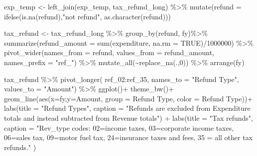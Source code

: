 \documentclass[
  letterpaper,
  DIV=11,
  numbers=noendperiod]{scrreport}
\newenvironment{Shaded}{\begin{snugshade}}{\end{snugshade}}
\newcommand{\AttributeTok}[1]{\textcolor[rgb]{0.40,0.45,0.13}{#1}}
\newcommand{\ConstantTok}[1]{\textcolor[rgb]{0.56,0.35,0.01}{#1}}
\newcommand{\DecValTok}[1]{\textcolor[rgb]{0.68,0.00,0.00}{#1}}
\newcommand{\FunctionTok}[1]{\textcolor[rgb]{0.28,0.35,0.67}{#1}}
\newcommand{\NormalTok}[1]{\textcolor[rgb]{0.00,0.23,0.31}{#1}}
\newcommand{\OtherTok}[1]{\textcolor[rgb]{0.00,0.23,0.31}{#1}}
\newcommand{\SpecialCharTok}[1]{\textcolor[rgb]{0.37,0.37,0.37}{#1}}
\newcommand{\StringTok}[1]{\textcolor[rgb]{0.13,0.47,0.30}{#1}}
\begin{document}
\begin{Shaded}
\begin{Highlighting}[]
    
\NormalTok{exp\_temp }\OtherTok{\textless{}{-}} \FunctionTok{left\_join}\NormalTok{(exp\_temp, tax\_refund\_long) }\SpecialCharTok{\%\textgreater{}\%}
  \FunctionTok{mutate}\NormalTok{(}\AttributeTok{refund =} \FunctionTok{ifelse}\NormalTok{(}\FunctionTok{is.na}\NormalTok{(refund),}\StringTok{"not refund"}\NormalTok{, }\FunctionTok{as.character}\NormalTok{(refund)))}

\NormalTok{tax\_refund }\OtherTok{\textless{}{-}}\NormalTok{ tax\_refund\_long }\SpecialCharTok{\%\textgreater{}\%} 
  \FunctionTok{group\_by}\NormalTok{(refund, fy)}\SpecialCharTok{\%\textgreater{}\%}
  \FunctionTok{summarize}\NormalTok{(}\AttributeTok{refund\_amount =} \FunctionTok{sum}\NormalTok{(expenditure, }\AttributeTok{na.rm =} \ConstantTok{TRUE}\NormalTok{)}\SpecialCharTok{/}\DecValTok{1000000}\NormalTok{) }\SpecialCharTok{\%\textgreater{}\%}
  \FunctionTok{pivot\_wider}\NormalTok{(}\AttributeTok{names\_from =}\NormalTok{ refund, }\AttributeTok{values\_from =}\NormalTok{ refund\_amount, }\AttributeTok{names\_prefix =} \StringTok{"ref\_"}\NormalTok{) }\SpecialCharTok{\%\textgreater{}\%}
  \FunctionTok{mutate\_all}\NormalTok{(}\SpecialCharTok{\textasciitilde{}}\FunctionTok{replace\_na}\NormalTok{(.,}\DecValTok{0}\NormalTok{)) }\SpecialCharTok{\%\textgreater{}\%}
  \FunctionTok{arrange}\NormalTok{(fy)}

\NormalTok{tax\_refund }\SpecialCharTok{\%\textgreater{}\%} 
  \FunctionTok{pivot\_longer}\NormalTok{( ref\_02}\SpecialCharTok{:}\NormalTok{ref\_35, }\AttributeTok{names\_to =} \StringTok{"Refund Type"}\NormalTok{, }\AttributeTok{values\_to =} \StringTok{"Amount"}\NormalTok{) }\SpecialCharTok{\%\textgreater{}\%}
  \FunctionTok{ggplot}\NormalTok{()}\SpecialCharTok{+}
  \FunctionTok{theme\_bw}\NormalTok{()}\SpecialCharTok{+}
  \FunctionTok{geom\_line}\NormalTok{(}\FunctionTok{aes}\NormalTok{(}\AttributeTok{x=}\NormalTok{fy,}\AttributeTok{y=}\NormalTok{Amount, }\AttributeTok{group =} \StringTok{\textasciigrave{}}\AttributeTok{Refund Type}\StringTok{\textasciigrave{}}\NormalTok{, }\AttributeTok{color =} \StringTok{\textasciigrave{}}\AttributeTok{Refund Type}\StringTok{\textasciigrave{}}\NormalTok{))}\SpecialCharTok{+}
  \FunctionTok{labs}\NormalTok{(}\AttributeTok{title =} \StringTok{"Refund Types"}\NormalTok{, }
       \AttributeTok{caption =} \StringTok{"Refunds are excluded from Expenditure totals and instead subtracted from Revenue totals"}\NormalTok{) }\SpecialCharTok{+} 
  \FunctionTok{labs}\NormalTok{(}\AttributeTok{title =} \StringTok{"Tax refunds"}\NormalTok{, }
       \AttributeTok{caption =} \StringTok{"Rev\_type codes: 02=income taxes, 03=corporate income taxes, 06=sales tax, 09=motor fuel tax, }
\StringTok{       24=insurance taxes and fees, 35 = all other tax refunds."}\NormalTok{ )}
\end{Highlighting}
\end{Shaded}
\end{document}
